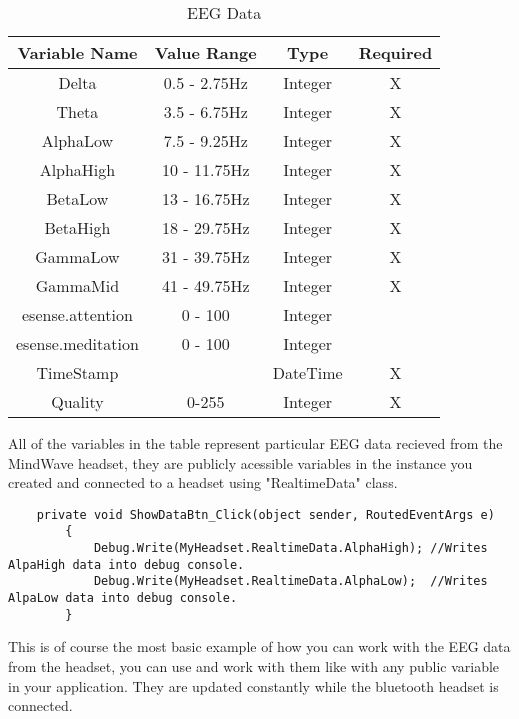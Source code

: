 \documentclass[a4paper,11pt]{book}
\begin{document}
\begin{table}[ht]
\caption{EEG Data} %
\centering %
\begin{tabular}{c c c c}
\hline\hline %
Variable Name & Value Range & Type & Required \\ [0.5ex]
\hline %
Delta & 0.5 - 2.75Hz & Integer & X \\
Theta & 3.5 - 6.75Hz & Integer & X \\
AlphaLow & 7.5 - 9.25Hz & Integer & X \\
AlphaHigh & 10 - 11.75Hz & Integer & X \\
BetaLow & 13 - 16.75Hz & Integer & X \\
BetaHigh & 18 - 29.75Hz & Integer & X \\
GammaLow & 31 - 39.75Hz & Integer & X \\
GammaMid & 41 - 49.75Hz & Integer & X \\
esense.attention & 0 - 100 & Integer &  \\
esense.meditation & 0 - 100 & Integer &  \\ [1ex]
TimeStamp &  & DateTime & X \\
Quality & 0-255 & Integer & X \\ [1ex] %
\hline %
\end{tabular}
\label{table:nonlin} %
\end{table}

All of the variables in the table represent particular EEG data recieved from the MindWave headset, they are publicly acessible variables in the instance you created and connected to a headset using "RealtimeData" class. 

\begin{lstlisting}
    private void ShowDataBtn_Click(object sender, RoutedEventArgs e)
        { 
            Debug.Write(MyHeadset.RealtimeData.AlphaHigh); //Writes AlpaHigh data into debug console.
            Debug.Write(MyHeadset.RealtimeData.AlphaLow);  //Writes AlpaLow data into debug console.
        }
\end{lstlisting}


\noindent This is of course the most basic example of how you can work with the EEG data from the headset, you can use and work with them like with any public variable in your application. They are updated constantly while the bluetooth headset is connected.
\end{document}
